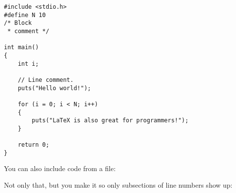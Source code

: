 
\begin{lstlisting}[style=Sublime-C++, caption=C++ Example]
#include <stdio.h>
#define N 10
/* Block
 * comment */
 
int main()
{
    int i;
 
    // Line comment.
    puts("Hello world!");
 
    for (i = 0; i < N; i++)
    {
        puts("LaTeX is also great for programmers!");
    }
 
    return 0;
}
\end{lstlisting}

You can also include code from a file:


Not only that, but you make it so only subsections of line numbers show up:


